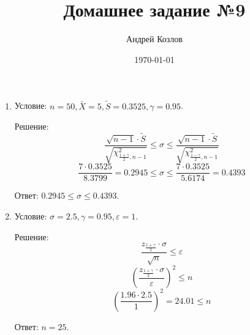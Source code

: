 \documentclass[12pt,a4paper]{article}
\begin{document}
\title{Домашнее задание №9}
\author{Андрей Козлов}
\date{\today}

\maketitle

\begin{enumerate}
	\item {
		Условие: $n = 50, \bar{X} = 5, \tilde{S} = 0.3525, \gamma = 0.95$.

		Решение:
		$$\frac{\sqrt{n - 1} \cdot \tilde{S}}{\sqrt{\chi_{\frac{1 + \gamma}{2}, n - 1}^2}} \leq \sigma \leq \frac{\sqrt{n - 1} \cdot \tilde{S}}{\sqrt{\chi_{\frac{1 - \gamma}{2}, n - 1}^2}}$$		
		$$\frac{7 \cdot 0.3525}{8.3799} = 0.2945 \leq \sigma \leq \frac{7 \cdot 0.3525}{5.6174} = 0.4393$$

		Ответ: $0.2945 \leq \sigma \leq 0.4393$.
	}

	\item {
		Условие: $\sigma = 2.5, \gamma = 0.95, \varepsilon = 1$.

		Решение:
		$$\frac{z_{\frac{1 + \gamma}{2}} \cdot \sigma}{\sqrt{n}} \leq \varepsilon$$
		$$\left( \frac{z_{\frac{1 + \gamma}{2}} \cdot \sigma}{\varepsilon} \right)^2 \leq n$$
		$$\left( \frac{1.96 \cdot 2.5}{1} \right)^2 = 24.01 \leq n$$

		Ответ: $n = 25$.
	}

\end{enumerate}
\end{document}
